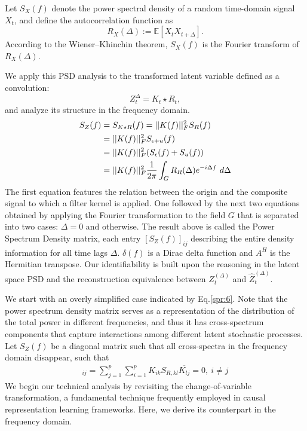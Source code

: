 \documentclass[10pt]{article}
\numberwithin{figure}{section}
\begin{document}
Let \( S_X(f) \) denote the power spectral density of a random time-domain signal \( X_t \), and define the autocorrelation function as
\[
R_X(\Delta) := \mathbb{E}[X_t X_{t + \Delta}].
\]
According to the Wiener--Khinchin theorem, \( S_X(f) \) is the Fourier transform of \( R_X(\Delta) \).

We apply this PSD analysis to the transformed latent variable defined as a convolution:
\[
Z_t^{\Delta} = K_t \star R_t,
\]
and analyze its structure in the frequency domain.
\begin{align}
    S_Z(f)&=S_{K\star R}(f)=||K(f)||_F^2S_R(f) \label{spr:1} \\
    &= ||K(f)||_F^2S_{\epsilon+u}(f) \notag\\
    &=||K(f)||_F^2(S_{\epsilon}(f)+S_u(f)) \notag\\
    &=||K(f)||_F^2\frac{1}{2\pi}\int_{G}^{}R_R(\Delta)e^{-i\Delta f}\ d\Delta \label{spr:1.1}
\end{align}
The first equation features the relation between the origin and the composite signal to which a filter kernel is applied.  One followed by the next two equations obtained by applying the Fourier transformation to the field $G$ that is separated into two cases: $\Delta = 0$ and otherwise. The result above is called the Power Spectrum Density matrix, each entry $[S_Z(f)]_{ij}$ describing the entire density information for all time lags $\Delta$.  $\delta(f)$ is a Dirac delta function and $ A^H$ is the Hermitian transpose. Our identifiability is built upon the reasoning in the latent space $\mathrm{PSD}$ and the reconstruction equivalence between $Z^{(\Delta)}_t$ and $\hat Z^{(\Delta)}_t$.  

We start with an overly simplified case indicated by Eq.\eqref{spr:6}. Note that the power spectrum density matrix serves as a representation of the distribution of the total power in different frequencies, and thus it has cross-spectrum components that capture interactions among different latent stochastic processes.  Let $S_Z(f)$ be a diagonal matrix such that all cross-spectra in the frequency domain disappear, such that
\begin{align}
    [S_Z]_{ij}=\sum\limits_{j=1}^{p}\sum\limits_{i=1}^{p}K_{ik}S_{R,kl}\overline{K_{lj}}=0 ,\ i\ne j
\end{align}
We begin our technical analysis by revisiting the change-of-variable transformation, a fundamental technique frequently employed in causal representation learning frameworks. Here, we derive its counterpart in the frequency domain.
\end{document}
